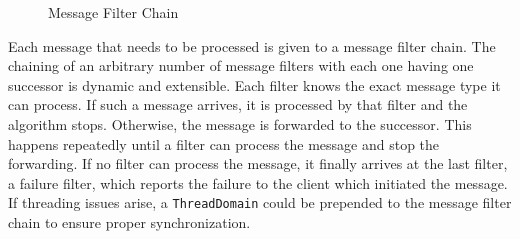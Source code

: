 \begin{figure}[H]
 \centering
 \caption{Message Filter Chain}
 \label{fig:network.discovery.messagefilterchain.concept}
\end{figure}

Each message that needs to be processed is given to a message filter chain. The chaining of an arbitrary number of message filters with each one having one successor is dynamic and extensible. Each filter knows the exact message type it can process. If such a message arrives, it is processed by that filter and the algorithm stops. Otherwise, the message is forwarded to the successor. This happens repeatedly until a filter can process the message and stop the forwarding. If no filter can process the message, it finally arrives at the last filter, a failure filter, which reports the failure to the client which initiated the message. If threading issues arise, a \texttt{ThreadDomain} could be prepended to the message filter chain to ensure proper synchronization.

